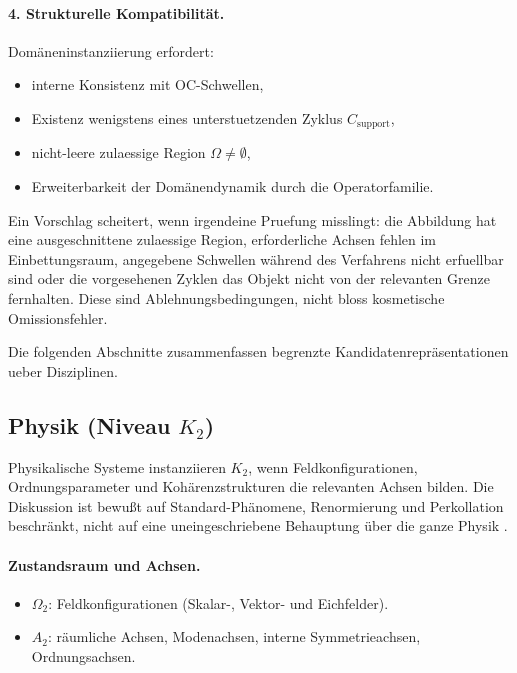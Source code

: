 \paragraph{4. Strukturelle Kompatibilität.}
Domäneninstanziierung erfordert:
\begin{itemize}
  \item interne Konsistenz mit OC-Schwellen,
  \item Existenz wenigstens eines unterstuetzenden Zyklus
        \(C_{\mathrm{support}}\),
  \item nicht-leere zulaessige Region \(\Omega\neq\emptyset\),
  \item Erweiterbarkeit der Domänendynamik durch die Operatorfamilie.
\end{itemize}

Ein Vorschlag scheitert, wenn irgendeine Pruefung misslingt: die Abbildung hat eine
ausgeschnittene zulaessige Region, erforderliche Achsen fehlen im Einbettungsraum,
angegebene Schwellen während des Verfahrens nicht erfuellbar sind oder die
vorgesehenen Zyklen das Objekt nicht von der relevanten Grenze fernhalten. Diese
sind Ablehnungsbedingungen, nicht bloss kosmetische Omissionsfehler.

Die folgenden Abschnitte zusammenfassen begrenzte Kandidatenrepräsentationen
ueber Disziplinen.

\subsection{Physik (Niveau \texorpdfstring{$K_2$}{K2})}

Physikalische Systeme instanziieren \(K_2\), wenn Feldkonfigurationen,
Ordnungsparameter und Kohärenzstrukturen die relevanten Achsen bilden.
Die Diskussion ist bewußt auf Standard-Phänomene, Renormierung und
Perkollation beschränkt, nicht auf eine uneingeschriebene Behauptung über die
ganze Physik \parencite{goldenfeld_lectures,wilson_renormalization,stauffer_percolation}.

\paragraph{Zustandsraum und Achsen.}
\begin{itemize}
  \item \(\Omega_{2}\): Feldkonfigurationen (Skalar-, Vektor- und
        Eichfelder).
  \item \(A_{2}\): räumliche Achsen, Modenachsen, interne Symmetrieachsen,
        Ordnungsachsen.
\end{itemize}

